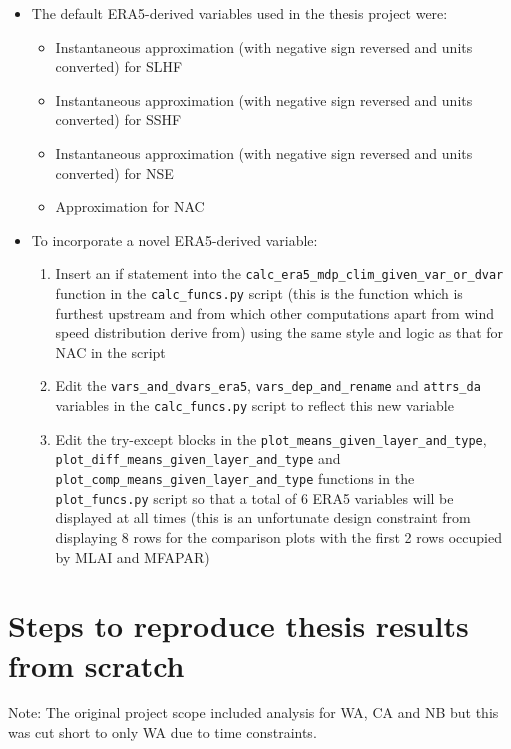 \begin{itemize}
	\item The default \ac{ERA5}-derived variables used in the thesis project were: 
	\begin{itemize}
		\item Instantaneous approximation (with negative sign reversed and units converted) for \acf{SLHF}
		\item Instantaneous approximation (with negative sign reversed and units converted) for \acf{SSHF}
		\item Instantaneous approximation (with negative sign reversed and units converted) for \acf{NSE}
		\item Approximation for \acf{NAC}
	\end{itemize}
	\item To incorporate a novel \ac{ERA5}-derived variable:
	\begin{enumerate}
		\item Insert an if statement into the \verb+calc_era5_mdp_clim_given_var_or_dvar+ function in the \verb+calc_funcs.py+ script (this is the function which is furthest upstream and from which other computations apart from wind speed distribution derive from) using the same style and logic as that for \ac{NAC} in the script
		\item Edit the \verb+vars_and_dvars_era5+, \verb+vars_dep_and_rename+ and \verb+attrs_da+ variables in the \verb+calc_funcs.py+ script to reflect this new variable
		\item Edit the try-except blocks in the \verb+plot_means_given_layer_and_type+, \verb+plot_diff_means_given_layer_and_type+ and \\ \verb+plot_comp_means_given_layer_and_type+ functions in the \\ \verb+plot_funcs.py+ script so that a total of 6 ERA5 variables will be displayed at all times (this is an unfortunate design constraint from displaying 8 rows for the comparison plots with the first 2 rows occupied by \ac{MLAI} and \ac{MFAPAR})
	\end{enumerate}
\end{itemize}

\section[Steps to reproduce thesis]{Steps to reproduce thesis results from scratch}

Note: The original project scope included analysis for \ac{WA}, \ac{CA} and \ac{NB} but this was cut short to only \ac{WA} due to time constraints.

